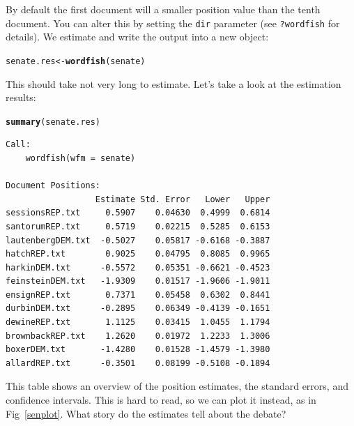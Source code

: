 \documentclass[10pt,a4paper]{article}\usepackage[]{graphicx}\usepackage[]{color}
\makeatletter
\newcommand{\hlstd}[1]{\textcolor[rgb]{0.345,0.345,0.345}{#1}}%
\newcommand{\hlkwb}[1]{\textcolor[rgb]{0.69,0.353,0.396}{#1}}%
\newcommand{\hlkwd}[1]{\textcolor[rgb]{0.737,0.353,0.396}{\textbf{#1}}}%
\newenvironment{kframe}{%
 \def\at@end@of@kframe{}%
 \ifinner\ifhmode%
  \def\at@end@of@kframe{\end{minipage}}%
  \begin{minipage}{\columnwidth}%
 \fi\fi%
 \def\FrameCommand##1{\hskip\@totalleftmargin \hskip-\fboxsep
 \colorbox{shadecolor}{##1}\hskip-\fboxsep
     \hskip-\linewidth \hskip-\@totalleftmargin \hskip\columnwidth}%
 \MakeFramed {\advance\hsize-\width
   \@totalleftmargin\z@ \linewidth\hsize
   \@setminipage}}%
 {\par\unskip\endMakeFramed%
 \at@end@of@kframe}
\newenvironment{knitrout}{}{} %
\makeatother
\begin{document}
By default the first document will a smaller position value than the tenth document.  You can alter this by setting the \texttt{dir} parameter (see \texttt{?wordfish} for details).  
We estimate and write the output into a new object:
\begin{knitrout}
\color{fgcolor}\begin{kframe}
\begin{alltt}
\hlstd{senate.res} \hlkwb{<-} \hlkwd{wordfish}\hlstd{(senate)}
\end{alltt}
\end{kframe}
\end{knitrout}
This should take not very long to estimate. Let's take a look at the estimation results: 
\begin{knitrout}
\color{fgcolor}\begin{kframe}
\begin{alltt}
\hlkwd{summary}\hlstd{(senate.res)}
\end{alltt}
\begin{verbatim}
Call:
	wordfish(wfm = senate)

Document Positions:
                  Estimate Std. Error   Lower   Upper
sessionsREP.txt     0.5907    0.04630  0.4999  0.6814
santorumREP.txt     0.5719    0.02215  0.5285  0.6153
lautenbergDEM.txt  -0.5027    0.05817 -0.6168 -0.3887
hatchREP.txt        0.9025    0.04795  0.8085  0.9965
harkinDEM.txt      -0.5572    0.05351 -0.6621 -0.4523
feinsteinDEM.txt   -1.9309    0.01517 -1.9606 -1.9011
ensignREP.txt       0.7371    0.05458  0.6302  0.8441
durbinDEM.txt      -0.2895    0.06349 -0.4139 -0.1651
dewineREP.txt       1.1125    0.03415  1.0455  1.1794
brownbackREP.txt    1.2620    0.01972  1.2233  1.3006
boxerDEM.txt       -1.4280    0.01528 -1.4579 -1.3980
allardREP.txt      -0.3501    0.08199 -0.5108 -0.1894
\end{verbatim}
\end{kframe}
\end{knitrout}
This table shows an overview of the position estimates, the standard errors, and confidence intervals. This is hard to read, so we can plot it instead, as in Fig~\ref{senplot}.
What story do the estimates tell about the debate? 
\end{document}
